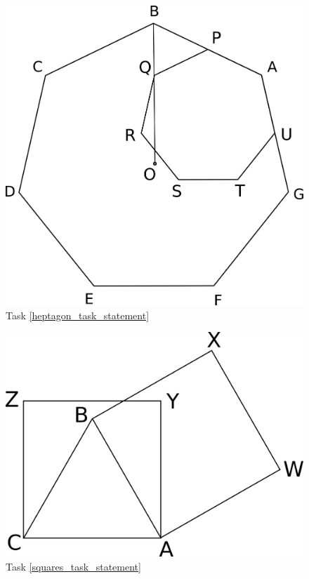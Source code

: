 \documentclass{article}
\begin{document}
\begin{enumerate}
    \begin{figure}[ht]
      \includegraphics{geometry1_1}
      \caption{Task \ref{heptagon_task_statement}} \label{heptagon_task}
    \end{figure}
    \begin{figure}[ht]      
      \includegraphics{geometry1_2}
      \caption{Task \ref{squares_task_statement}} \label{squares_task}
    \end{figure}

\end{enumerate}
\end{document}
